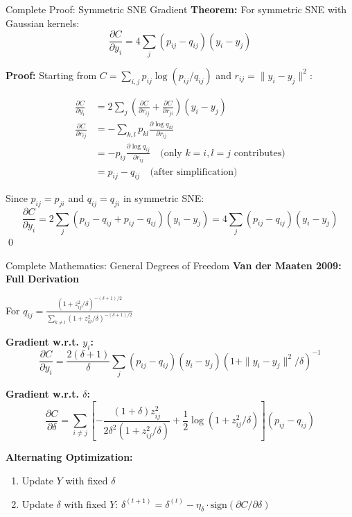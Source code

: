 \documentclass[aspectratio=169]{beamer}
\begin{document}
\begin{frame}{Complete Proof: Symmetric SNE Gradient}
\small
\textbf{Theorem:} For symmetric SNE with Gaussian kernels:
$$\frac{\partial C}{\partial y_i} = 4\sum_j (p_{ij} - q_{ij})(y_i - y_j)$$

\textbf{Proof:}
Starting from $C = \sum_{i,j} p_{ij} \log(p_{ij}/q_{ij})$ and $r_{ij} = \|y_i - y_j\|^2$:

\begin{align*}
\frac{\partial C}{\partial y_i} &= 2\sum_j \left(\frac{\partial C}{\partial r_{ij}} + \frac{\partial C}{\partial r_{ji}}\right)(y_i - y_j)\\
\frac{\partial C}{\partial r_{ij}} &= -\sum_{k,l} p_{kl} \frac{\partial \log q_{kl}}{\partial r_{ij}}\\
&= -p_{ij} \frac{\partial \log q_{ij}}{\partial r_{ij}} \quad \text{(only } k=i, l=j \text{ contributes)}\\
&= p_{ij} - q_{ij} \quad \text{(after simplification)}
\end{align*}

Since $p_{ij} = p_{ji}$ and $q_{ij} = q_{ji}$ in symmetric SNE:
$$\frac{\partial C}{\partial y_i} = 2\sum_j (p_{ij} - q_{ij} + p_{ij} - q_{ij})(y_i - y_j) = 4\sum_j (p_{ij} - q_{ij})(y_i - y_j)$$ \qed
\end{frame}

\begin{frame}{Complete Mathematics: General Degrees of Freedom}
\textbf{Van der Maaten 2009: Full Derivation}

For $q_{ij} = \frac{(1 + z_{ij}^2/\delta)^{-(\delta+1)/2}}{\sum_{k \neq l}(1 + z_{kl}^2/\delta)^{-(\delta+1)/2}}$

\textbf{Gradient w.r.t. $y_i$:}
$$\frac{\partial C}{\partial y_i} = \frac{2(\delta + 1)}{\delta}\sum_j (p_{ij} - q_{ij})(y_i - y_j)(1 + \|y_i - y_j\|^2/\delta)^{-1}$$

\textbf{Gradient w.r.t. $\delta$:}
\small
$$\frac{\partial C}{\partial \delta} = \sum_{i \neq j} \left[-\frac{(1+\delta)z_{ij}^2}{2\delta^2(1 + z_{ij}^2/\delta)} + \frac{1}{2}\log(1 + z_{ij}^2/\delta)\right](p_{ij} - q_{ij})$$

\textbf{Alternating Optimization:}
\begin{enumerate}
\item Update $Y$ with fixed $\delta$
\item Update $\delta$ with fixed $Y$: $\delta^{(t+1)} = \delta^{(t)} - \eta_\delta \cdot \text{sign}(\partial C/\partial \delta)$
\end{enumerate}
\end{frame}
\end{document}
